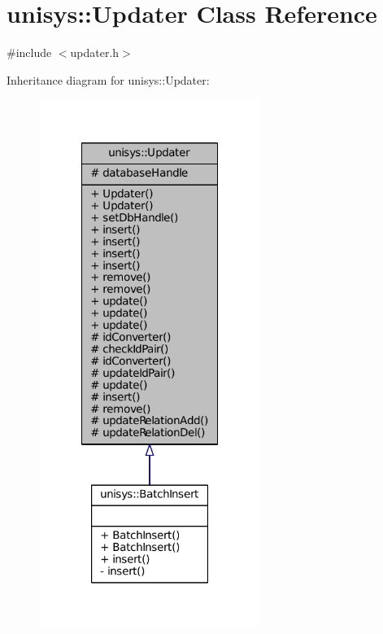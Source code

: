 \hypertarget{classunisys_1_1Updater}{\section{unisys\-:\-:Updater Class Reference}
\label{classunisys_1_1Updater}
}


{\ttfamily \#include $<$updater.\-h$>$}



Inheritance diagram for unisys\-:\-:Updater\-:
\nopagebreak
\begin{figure}[H]
\begin{center}
\leavevmode
\includegraphics[width=204pt]{classunisys_1_1Updater__inherit__graph}
\end{center}
\end{figure}


